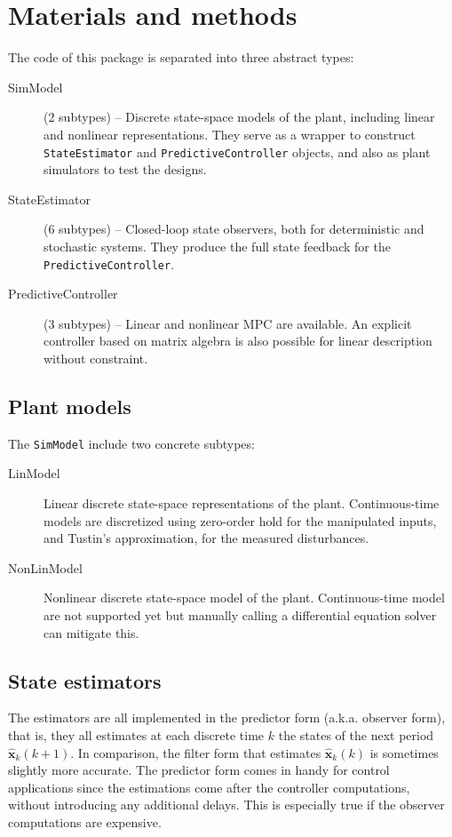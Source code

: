 
\section{Materials and methods}

The code of this package is separated into three abstract types:
\begin{description}
    \item[SimModel] (2 subtypes) -- Discrete state-space models of the plant, including linear and nonlinear representations. They serve as a wrapper to construct \texttt{StateEstimator} and \texttt{PredictiveController} objects, and also as plant simulators to test the designs.
    \item[StateEstimator] (6 subtypes) -- Closed-loop state observers, both for deterministic and stochastic systems. They produce the full state feedback for the \texttt{PredictiveController}.
    \item[PredictiveController] (3 subtypes) -- Linear and nonlinear MPC are available. An explicit controller based on matrix algebra is also possible for linear description without constraint.
\end{description}

\subsection{Plant models}

The \texttt{SimModel} include two concrete subtypes:
\begin{description}
    \item[LinModel] Linear discrete state-space representations of the plant. Continuous-time models are discretized using zero-order hold for the manipulated inputs, and Tustin's approximation, for the measured disturbances.
    \item[NonLinModel] Nonlinear discrete state-space model of the plant. Continuous-time model are not supported yet but manually calling a differential equation solver can mitigate this.
\end{description}

\subsection{State estimators}

The estimators are all implemented in the predictor form (a.k.a. observer form), that is, they all estimates at each discrete time $k$ the states of the next period $\mathbf{\hat{x}}_k(k+1)$. In comparison, the filter form that estimates $\mathbf{\hat{x}}_k(k)$ is sometimes slightly more accurate. The predictor form comes in handy for control applications since the estimations come after the controller computations, without introducing any additional delays. This is especially true if the observer computations are expensive.


